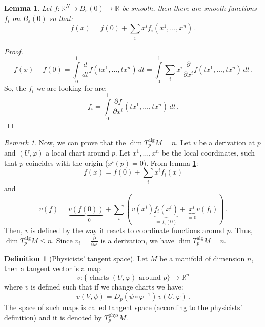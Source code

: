 \documentclass[a4paper,11pt,titlepage, article, oneside]{memoir}
\numberwithin{equation}{section}
\newtheorem{lemma}[theorem]{Lemma}
\theoremstyle{definition}
\newtheorem{definition}[theorem]{Definition}
\theoremstyle{remark}
\newtheorem{remark}[theorem]{Remark}
\newcommand{\rfield}{\mathbb{R}}
\newcommand{\diondi}[1]{\frac{d}{d{#1}}}
\newcommand{\deonde}[1]{\frac{\partial}{\partial {#1}}}
\newcommand{\defonde}[2]{\frac{\partial {#1}}{\partial {#2}}}
\newcommand{\tangentphys}[1]{T_{#1}^{\text{phys}}}
\newcommand{\tangentalg}[1]{T_{#1}^{\text{alg}}}
\begin{document}
\begin{lemma} \label{usefullemma}
Let $f \colon \rfield^N \supset B_{\varepsilon}(0) \rightarrow \rfield$ be smooth, then there are smooth functions $f_i$ on $B_{\varepsilon}(0)$ so that:
\begin{equation}
f(x) = f(0) + \sum\limits_i x^i f_i(x^1, \ldots, x^n) \, .
\end{equation}
\end{lemma}
\begin{proof}
\begin{equation*}
f(x)-f(0) = \int\limits_0^1 \diondi{t} f(tx^1, \ldots, tx^n)\, dt = \int\limits_0^1 \sum_i x^i \deonde{x^i} f(tx^1, \ldots, tx^n) \, dt \, .
\end{equation*}
So, the $f_i$ we are looking for are:
\begin{equation*}
f_i = \int\limits_0^1 \defonde{f}{x^i}(tx^1, \ldots, tx^n)\, dt \, .
\end{equation*}
\end{proof}

\begin{remarkbox}\begin{remark}
Now, we can prove that the $\dim \tangentalg{p} M = n$. Let $v$ be a derivation at $p$ and $(U, \varphi)$ a local chart around $p$. Let $x^1, \ldots, x^n$ be the local coordinates, such that $p$ coincides with the origin ($x^i(p) = 0$). From lemma \ref{usefullemma}:
$$f(x) = f(0) + \sum\limits_i x^i f_i(x)$$
and
\[ v(f) = \underbrace{v(f(0))}_{=0} + \sum\limits_i \left( v(x^i) \underbrace{f_i(x^i)}_{=f_i(0)} + \underbrace{x^i}_{=0} v(f_i) \right) \, . \]
Then, $v$ is defined by the way it reacts to coordinate functions around $p$. Thus, $\dim \tangentalg{p} M \le n$. Since $v_i = \deonde{x^i}$ is a derivation, we have $\dim \tangentalg{p} M = n$.
\end{remark}\end{remarkbox}

\begin{definition}[Physicists' tangent space]
Let $M$ be a manifold of dimension $n$, then a tangent vector is a map
\begin{equation}
v \colon \{ \text{ charts } (U, \varphi) \text{ around } p \} \rightarrow \rfield^n
\end{equation}
where $v$ is defined such that if we change charts we have:
\begin{equation} \label{phystransf}
v(V, \psi) = D_p (\psi \circ \varphi^{-1})\, v(U, \varphi) \, .
\end{equation}
The space of such maps is called tangent space (according to the physicists' definition) and it is denoted by $\tangentphys{p} M$.
\end{definition}
\end{document}
